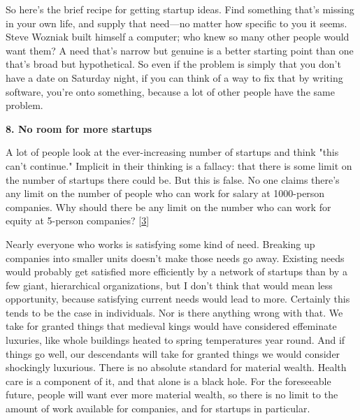 So here's the
                    brief recipe for getting startup ideas. Find something
                    that's missing in your own life, and supply that
                    need---no matter how specific to you it seems. Steve
                    Wozniak built himself a computer; who knew so many other
                    people would want them? A need that's narrow but genuine is
                    a better starting point than one that's broad but
                    hypothetical. So even if the problem is simply that you
                    don't have a date on Saturday night, if you can think of a
                    way to fix that by writing software, you're onto something,
                    because a lot of other people have the same problem.

\textbf{8. No room for more startups}

A lot of people look at the ever-increasing
                    number of startups and think "this can't continue." Implicit
                    in their thinking is a fallacy: that there is some limit on
                    the number of startups there could be. But this is false. No
                    one claims there's any limit on the number of people who can
                    work for salary at 1000-person companies. Why should there
                    be any limit on the number who can work for equity at
                    5-person companies?
                    [\href{\#f3n}{3}]

Nearly everyone who works is satisfying some
                    kind of need. Breaking up companies into smaller units
                    doesn't make those needs go away. Existing needs would
                    probably get satisfied more efficiently by a network of
                    startups than by a few giant, hierarchical organizations,
                    but I don't think that would mean less opportunity, because
                    satisfying current needs would lead to more. Certainly this
                    tends to be the case in individuals. Nor is there anything
                    wrong with that. We take for granted things that medieval
                    kings would have considered effeminate luxuries, like whole
                    buildings heated to spring temperatures year round. And if
                    things go well, our descendants will take for granted things
                    we would consider shockingly luxurious. There is no absolute
                    standard for material wealth. Health care is a component of
                    it, and that alone is a black hole. For the foreseeable
                    future, people will want ever more material wealth, so there
                    is no limit to the amount of work available for companies,
                    and for startups in particular.

